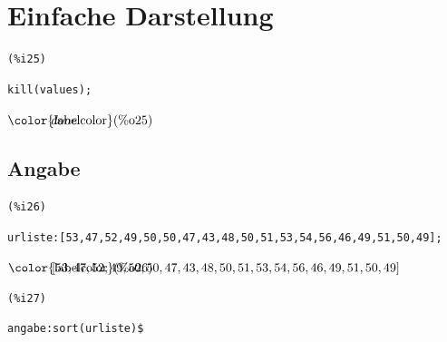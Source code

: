 \documentclass[12pt]{article}
\begin{document}
\section{Einfache Darstellung}



\noindent
\begin{minipage}[t]{8ex}{\color{red}\bf
\begin{verbatim}
(%i25) 
\end{verbatim}}
\end{minipage}
\begin{minipage}[t]{\textwidth}{\color{blue}
\begin{verbatim}
kill(values);
\end{verbatim}}
\end{minipage}
\begin{math}\displaystyle
\parbox{8ex}{\color{labelcolor}(\%o25) }
done
\end{math}


\subsection{Angabe}



\noindent
\begin{minipage}[t]{8ex}{\color{red}\bf
\begin{verbatim}
(%i26) 
\end{verbatim}}
\end{minipage}
\begin{minipage}[t]{\textwidth}{\color{blue}
\begin{verbatim}
urliste:[53,47,52,49,50,50,47,43,48,50,51,53,54,56,46,49,51,50,49];
\end{verbatim}}
\end{minipage}
\begin{math}\displaystyle
\parbox{8ex}{\color{labelcolor}(\%o26) }
[53,47,52,49,50,50,47,43,48,50,51,53,54,56,46,49,51,50,49]
\end{math}


\noindent
\begin{minipage}[t]{8ex}{\color{red}\bf
\begin{verbatim}
(%i27) 
\end{verbatim}}
\end{minipage}
\begin{minipage}[t]{\textwidth}{\color{blue}
\begin{verbatim}
angabe:sort(urliste)$
\end{verbatim}}
\end{minipage}
\end{document}
